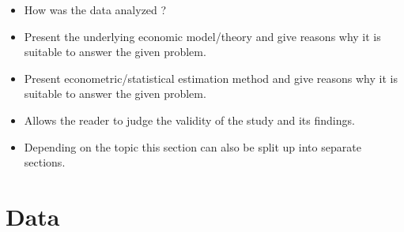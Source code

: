 \documentclass[a4paper,11pt]{article}
\begin{document}
\begin{itemize}

    \item How was the data analyzed ?

    \item Present the underlying economic model/theory and
        give reasons why it is suitable to answer the given problem.

    \item Present econometric/statistical estimation method and
        give reasons why it is suitable to answer the given problem.

    \item Allows the reader to judge the validity of the study and
        its findings.

    \item Depending on the topic this section can also be split up
        into separate sections.

\end{itemize}
\newpage

\section{Data}\label{Sec:Data}
\end{document}
